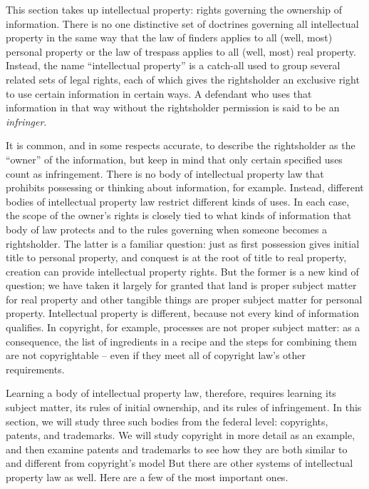 This section takes up intellectual property: rights governing the ownership of
information. There is no one distinctive set of doctrines governing all
intellectual property in the same way that the law of finders applies to all
(well, most) personal property or the law of trespass applies to all (well,
most) real property. Instead, the name ``intellectual property'' is a catch-all
used to group several related sets of legal rights, each of which gives the
rightsholder an exclusive right to use certain information in certain ways. A
defendant who uses that information in that way without the rightsholder
permission is said to be an \textit{infringer}. 

It is common, and in some respects accurate, to describe the rightsholder as the
``owner'' of the information, but keep in mind that only certain specified uses
count as infringement. There is no body of intellectual property law that
prohibits possessing or thinking about information, for example. Instead,
different bodies of intellectual property law restrict different kinds of uses.
In each case, the scope of the owner's rights is closely tied to what kinds of
information that body of law protects and to the rules governing when someone
becomes a rightsholder. The latter is a familiar question: just as first
possession gives initial title to personal property, and conquest is at the
root of title to real property, creation can provide intellectual property
rights. But the former is a new kind of question; we have taken it largely for
granted that land is proper subject matter for real property and other tangible
things are proper subject matter for personal property. Intellectual property
is different, because not every kind of information qualifies. In copyright,
for example, processes are not proper subject matter: as a consequence, the
list of ingredients in a recipe and the steps for combining them are not
copyrightable -- even if they meet all of copyright law's other requirements. 

Learning a body of intellectual property law, therefore, requires learning its
subject matter, its rules of initial ownership, and its rules of infringement.
In this section, we will study three such bodies from the federal level:
copyrights, patents, and trademarks. We will study copyright in more detail as
an example, and then examine patents and trademarks to see how they are both
similar to and different from copyright's model But there are other systems of
intellectual property law as well. Here are a few of the most important ones.



